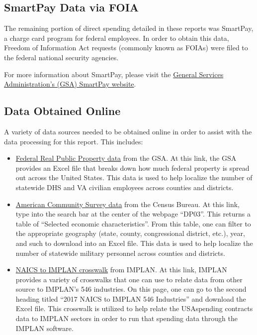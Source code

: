 \documentclass[
]{book}
\begin{document}
\hypertarget{smartpay-data-via-foia}{%
\subsection{SmartPay Data via FOIA}\label{smartpay-data-via-foia}}

The remaining portion of direct spending detailed in these reports was SmartPay, a charge card program for federal employees. In order to obtain this data, Freedom of Information Act requests (commonly known as FOIAs) were filed to the federal national security agencies.

For more information about SmartPay, please visit the \href{https://www.gsa.gov/travel/plan-book/gsa-smartpay}{General Services Administration's (GSA) SmartPay website}.

\hypertarget{data-obtained-online}{%
\subsection{Data Obtained Online}\label{data-obtained-online}}

A variety of data sources needed to be obtained online in order to assist with the data processing for this report. This includes:

\begin{itemize}
\item
  \href{https://www.gsa.gov/policy-regulations/policy/real-property-policy/asset-management/federal-real-property-profile-frpp/federal-real-property-public-data-set}{Federal Real Public Property data} from the GSA. At this link, the GSA provides an Excel file that breaks down how much federal property is spread out across the United States. This data is used to help localize the number of statewide DHS and VA civilian employees across counties and districts.
\item
  \href{https://data.census.gov/cedsci/}{American Community Survey data} from the Census Bureau. At this link, type into the search bar at the center of the webpage ``DP03''. This returns a table of ``Selected economic characteristics''. From this table, one can filter to the appropriate geography (state, county, congressional district, etc.), year, and such to download into an Excel file. This data is used to help localize the number of statewide military personnel across counties and districts.
\item
  \href{https://support.implan.com/hc/en-us/articles/360034896614-546-Industries-Conversions-Bridges-Construction-2018-Data}{NAICS to IMPLAN crosswalk} from IMPLAN. At this link, IMPLAN provides a variety of crosswalks that one can use to relate data from other source to IMPLAN's 546 industries. On this page, one can go to the second heading titled ``2017 NAICS to IMPLAN 546 Industries'' and download the Excel file. This crosswalk is utilized to help relate the USAspending contracts data to IMPLAN sectors in order to run that spending data through the IMPLAN software.
\end{itemize}
\end{document}
